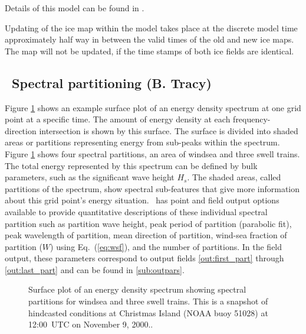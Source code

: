 \noindent
Details of this model can be found in \cite{tol:OMOD03a}.

Updating of the ice map within the model takes place at the discrete model
time approximately half way in between the valid times of the old and new ice
maps. The map will not be updated, if the time stamps of both ice fields are
identical.


\vssub
\subsection{~Spectral partitioning \hfill {\rm (B. Tracy)}}
\vssub

Figure \ref{fig:partitions} shows an example surface plot of an energy density
spectrum at one grid point at a specific time.  The amount of energy density
at each frequency-direction intersection is shown by this surface.  The
surface is divided into shaded areas or partitions representing energy from
sub-peaks within the spectrum.  Figure \ref{fig:partitions} shows four
spectral partitions, an area of windsea and three swell trains.  The total
energy represented by this spectrum can be defined by bulk parameters, such as
the significant wave height $H_s$. The shaded areas, called partitions of the
spectrum, show spectral sub-features that give more information about this
grid point's energy situation.  \ws\ has point and field output options
available to provide quantitative descriptions of these individual spectral
partition such as partition wave height, peak period of partition (parabolic
fit), peak wavelength of partition, mean direction of partition, wind-sea
fraction of partition ($W$) using Eq.~(\ref{eq:wsf}), and the number of
partitions.  In the field output, these parameters correspond to output fields
\ref{out:first_part} through \ref{out:last_part} and can be found in
\para\ref{sub:outpars}.

\begin{figure} \begin{center}
\caption{Surface plot of an energy density spectrum showing spectral
         partitions for windsea and three swell trains.  This is a snapshot of
         hindcasted conditions at Christmas Island (NOAA buoy 51028) at
         12:00~UTC on November 9, 2000..}
         \label{fig:partitions} \botline
\end{center}
\end{figure}


